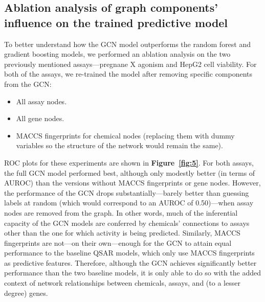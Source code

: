 \documentclass{ws-procs11x85}
\begin{document}
\subsection{Ablation analysis of graph components' influence on the trained predictive model}
To better understand how the GCN model outperforms the random forest and gradient boosting models, we performed an ablation analysis on the two previously mentioned assays---pregnane X agonism and HepG2 cell viability.
For both of the assays, we re-trained the model after removing specific components from the GCN:
\begin{itemize}
   \item All assay nodes.
   \item All gene nodes.
   \item MACCS fingerprints for chemical nodes (replacing them with dummy variables so the structure of the network would remain the same).
\end{itemize}
ROC plots for these experiments are shown in \textbf{Figure~\ref{fig:5}}.
For both assays, the full GCN model performed best, although only modestly better (in terms of AUROC) than the versions without MACCS fingerprints or gene nodes.
However, the performance of the GCN drops substantially---barely better than guessing labels at random (which would correspond to an AUROC of 0.50)---when assay nodes are removed from the graph.
In other words, much of the inferential capacity of the GCN models are conferred by chemicals' connections to assays other than the one for which activity is being predicted.
Similarly, MACCS fingerprints are not---on their own---enough for the GCN to attain equal performance to the baseline QSAR models, which only use MACCS fingerprints as predictive features.
Therefore, although the GCN achieves significantly better performance than the two baseline models, it is only able to do so with the added context of network relationships between chemicals, assays, and (to a lesser degree) genes.
\end{document}
